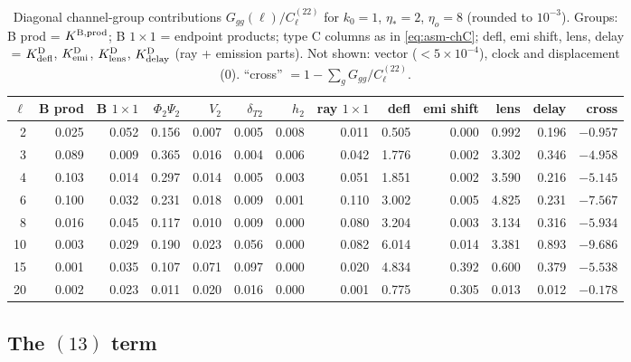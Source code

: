 \begin{table}[t]
\centering\scriptsize
\setlength{\tabcolsep}{3pt}
\begin{tabular}{r|rr|rrrrr|rrrr|r}
\hline
$\ell$ & B prod & B $1{\times}1$ & $\Phi_2\Psi_2$ & $V_2$ & $\delta_{T2}$ & $h_2$ & ray $1{\times}1$ & defl & emi shift & lens & delay & cross\\
\hline
2 & 0.025 & 0.052 & 0.156 & 0.007 & 0.005 & 0.008 & 0.011 & 0.505 & 0.000 & 0.992 & 0.196 & $-0.957$\\
3 & 0.089 & 0.009 & 0.365 & 0.016 & 0.004 & 0.006 & 0.042 & 1.776 & 0.002 & 3.302 & 0.346 & $-4.958$\\
4 & 0.103 & 0.014 & 0.297 & 0.014 & 0.005 & 0.003 & 0.051 & 1.851 & 0.002 & 3.590 & 0.216 & $-5.145$\\
6 & 0.100 & 0.032 & 0.231 & 0.018 & 0.009 & 0.001 & 0.110 & 3.002 & 0.005 & 4.825 & 0.231 & $-7.567$\\
8 & 0.016 & 0.045 & 0.117 & 0.010 & 0.009 & 0.000 & 0.080 & 3.204 & 0.003 & 3.134 & 0.316 & $-5.934$\\
10 & 0.003 & 0.029 & 0.190 & 0.023 & 0.056 & 0.000 & 0.082 & 6.014 & 0.014 & 3.381 & 0.893 & $-9.686$\\
15 & 0.001 & 0.035 & 0.107 & 0.071 & 0.097 & 0.000 & 0.020 & 4.834 & 0.392 & 0.600 & 0.379 & $-5.538$\\
20 & 0.002 & 0.023 & 0.011 & 0.020 & 0.016 & 0.000 & 0.001 & 0.775 & 0.305 & 0.013 & 0.012 & $-0.178$\\
\hline
\end{tabular}
\caption{Diagonal channel-group contributions $G_{gg}(\ell)/C^{(22)}_\ell$ for $k_0=1$, $\eta_*=2$, $\eta_o=8$ (rounded to $10^{-3}$).
Groups: B prod = $K^{\rm B,prod}$; B $1{\times}1$ = endpoint products; type C columns as in \eqref{eq:asm-chC}; defl, emi shift,
lens, delay = $K^{\rm D}_{\rm defl}$, $K^{\rm D}_{\rm emi}$, $K^{\rm D}_{\rm lens}$, $K^{\rm D}_{\rm delay}$ (ray + emission parts).  Not shown:
vector ($<5\times10^{-4}$), clock and displacement ($0$).  ``cross'' $=1-\sum_gG_{gg}/C^{(22)}_\ell$.}
\label{tab:mono-groups}
\end{table}

\subsection{The \texorpdfstring{$(13)$}{(13)} term}
\label{sec:mono-13}
